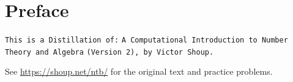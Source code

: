 

\chapter*{Preface}

\begin{center}
    \vfill
    \verb|This is a Distillation of:|
    \verb |A Computational Introduction to Number Theory and Algebra|
    \verb|(Version 2), by Victor Shoup.|

    \vspace{1em}
    See \textcolor{blue}{\href{https://shoup.net/ntb/}{https://shoup.net/ntb/}} for the original text and practice problems.
    \vfill
\end{center}
